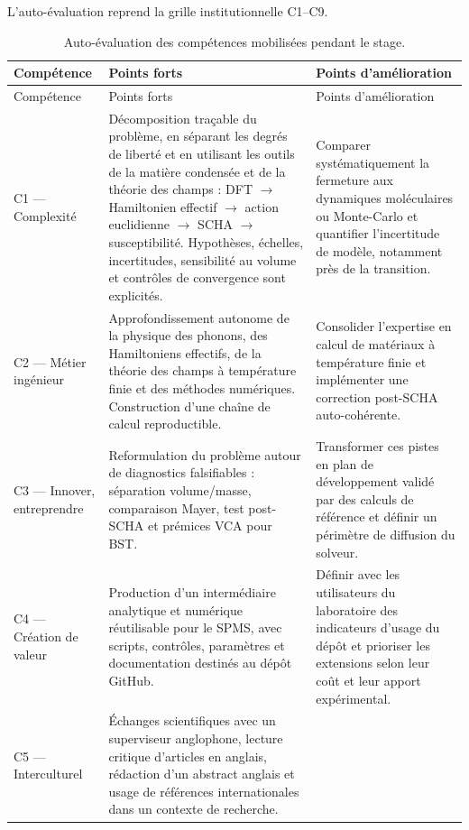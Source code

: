 L'auto-évaluation reprend la grille institutionnelle C1--C9.

\begingroup
\fontsize{10.2pt}{11.9pt}\selectfont
\begin{longtable}{p{}p{}p{}}
\caption{Auto-évaluation des compétences mobilisées pendant le stage.}
\label{tab:cs_self_assessment}\\
\hline
Compétence & Points forts & Points d'amélioration \\
\hline
\endfirsthead
\hline
Compétence & Points forts & Points d'amélioration \\
\hline
\endhead
C1 --- Complexité &
Décomposition traçable du problème, en séparant les degrés de liberté et en
utilisant les outils de la matière condensée et de la théorie des champs : DFT
$\rightarrow$ Hamiltonien effectif
$\rightarrow$ action euclidienne $\rightarrow$ SCHA $\rightarrow$
susceptibilité. Hypothèses, échelles, incertitudes, sensibilité au volume et
contrôles de convergence sont explicités. &
Comparer systématiquement la fermeture aux dynamiques moléculaires ou
Monte-Carlo et quantifier l'incertitude de modèle, notamment près de la
transition. \\
\hline
C2 --- Métier ingénieur &
Approfondissement autonome de la physique des phonons, des Hamiltoniens
effectifs, de la théorie des champs à température finie et des méthodes
numériques. Construction d'une chaîne de calcul reproductible. &
Consolider l'expertise en calcul de matériaux à température finie et
implémenter une correction post-SCHA auto-cohérente. \\
\hline
C3 --- Innover, entreprendre &
Reformulation du problème autour de diagnostics falsifiables : séparation
volume/masse, comparaison Mayer, test post-SCHA et prémices VCA pour BST. &
Transformer ces pistes en plan de développement validé par des calculs de
référence et définir un périmètre de diffusion du solveur. \\
\hline
C4 --- Création de valeur &
Production d'un intermédiaire analytique et numérique réutilisable pour le
SPMS, avec scripts, contrôles, paramètres et documentation destinés au dépôt
GitHub. &
Définir avec les utilisateurs du laboratoire des indicateurs d'usage du dépôt
et prioriser les extensions selon leur coût et leur apport expérimental. \\
\hline
C5 --- Interculturel &
Échanges scientifiques avec un superviseur anglophone, lecture critique
d'articles en anglais, rédaction d'un abstract anglais et usage de références
internationales dans un contexte de recherche. &

\end{longtable}
